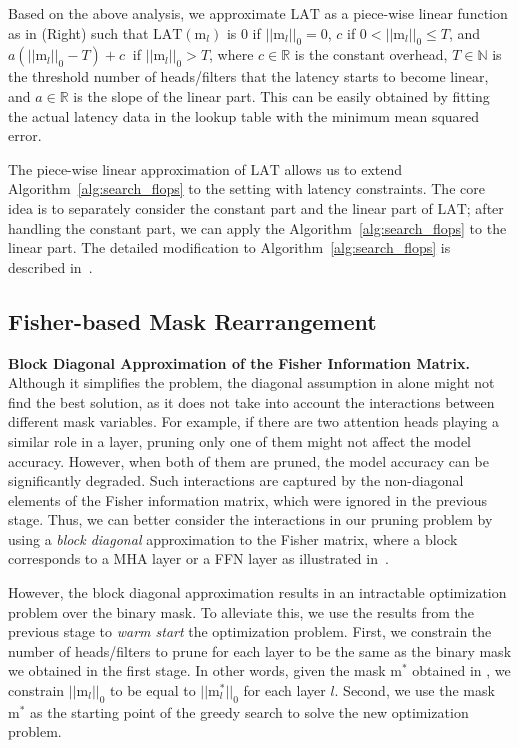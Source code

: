 Based on the above analysis, we approximate $\text{LAT}$ as a piece-wise linear function as in  (Right)
such that $\text{LAT}(\text{m}_l)$ is 0 if $||\text{m}_l||_0 = 0$,
$c$ if $0 < ||\text{m}_l||_0 \leq T$, and 
$a(||\text{m}_l||_0 - T) + c \ $ if $||\text{m}_l||_0 > T$,
where $c \in \mathbb{R}$ is the constant overhead, $T \in \mathbb{N}$ is the threshold number of heads/filters that the latency starts to become linear, and $a \in \mathbb{R}$ is the slope of the linear part.
This can be easily obtained by fitting the actual latency data in the lookup table with the minimum mean squared error.

The piece-wise linear approximation of $\text{LAT}$ allows us to extend Algorithm~\ref{alg:search_flops} to the setting with latency constraints.
The core idea is to separately consider the constant part and the linear part of $\text{LAT}$; after handling the constant part, we can apply the Algorithm~\ref{alg:search_flops} to the linear part.
The detailed modification to Algorithm~\ref{alg:search_flops} is described in~.

\vspace{-2mm}
\subsection{Fisher-based Mask Rearrangement}
\label{subsec:rearrange}
\vspace{-1mm}

\textbf{Block Diagonal Approximation of the Fisher Information Matrix.}
Although it simplifies the problem, the diagonal assumption in  alone might not find the best solution, as it does not take into account the interactions between different mask variables.
For example, if there are two attention heads playing a similar role in a layer, pruning only one of them might not affect the model accuracy.
However, when both of them are pruned, the model accuracy can be significantly degraded.
Such interactions are captured by the non-diagonal elements of the Fisher information matrix, which were ignored in the previous stage.
Thus, we can better consider the interactions in our pruning problem by using a \textit{block diagonal} approximation to the Fisher matrix, where a block corresponds to a MHA layer or a FFN layer as illustrated in~.

However, the block diagonal approximation results in an intractable optimization problem over the binary mask.
To alleviate this, we use the results from the previous stage to \textit{warm start} the optimization problem.
First, we constrain the number of heads/filters to prune for each layer to be the same as the binary mask we obtained in the first stage.
In other words, given the mask $\text{m}^\ast$ obtained in , we constrain 
$|| \text{m}_l ||_0$ to be equal to  $||\text{m}^{\ast}_l ||_0 $ for each layer $l$.
Second, we use the mask $\text{m}^\ast$ as the starting point of the greedy search to solve the new optimization problem. 

